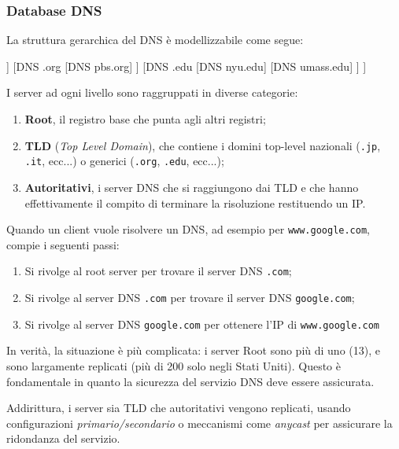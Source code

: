 \documentclass[a4paper,11pt]{article}
\begin{document}
\subsubsection{Database DNS}
La struttura gerarchica del DNS è modellizzabile come segue:
\begin{center}
	\begin{forest}
		[DNS Root, rectstyle
		[DNS .com
			[DNS yahoo.com]
			[DNS google.com]
		]
		[DNS .org
			[DNS pbs.org]
		]
		[DNS .edu
			[DNS nyu.edu]
			[DNS umass.edu]
		]
		]	
	\end{forest}
\end{center}

I server ad ogni livello sono raggruppati in diverse categorie:
\begin{enumerate}
	\item \textbf{Root}, il registro base che punta agli altri registri;
	\item \textbf{TLD} (\textit{Top Level Domain}), che contiene i domini top-level nazionali (\lstinline|.jp|, \lstinline|.it|, ecc...) o generici (\lstinline|.org|, \lstinline|.edu|, ecc...);
	\item \textbf{Autoritativi}, i server DNS che si raggiungono dai TLD e che hanno effettivamente il compito di terminare la risoluzione restituendo un IP.
\end{enumerate}

Quando un client vuole risolvere un DNS, ad esempio per \lstinline|www.google.com|, compie i seguenti passi:
\begin{enumerate}
	\item Si rivolge al root server per trovare il server DNS \lstinline|.com|;
	\item Si rivolge al server DNS \lstinline|.com| per trovare il server DNS \lstinline|google.com|;
	\item Si rivolge al server DNS \lstinline|google.com| per ottenere l'IP di \lstinline|www.google.com|
\end{enumerate}

In verità, la situazione è più complicata: i server Root sono più di uno (13), e sono largamente replicati (più di 200 solo negli Stati Uniti). Questo è fondamentale in quanto la sicurezza del servizio DNS deve essere assicurata.

Addirittura, i server sia TLD che autoritativi vengono replicati, usando configurazioni \textit{primario/secondario} o meccanismi come \textit{anycast} per assicurare la ridondanza del servizio.
\end{document}
